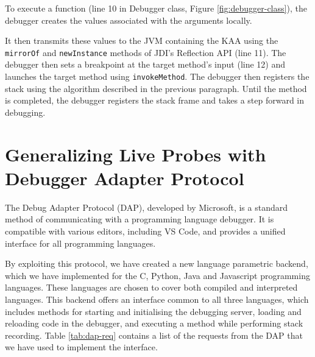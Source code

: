 \documentclass[english,submission]{programming}
\newcommand{\code}[1]{\colorbox{codegray}{\texttt{#1}}}
\begin{document}
To execute a function (line 10 in Debugger class, Figure \ref{fig:debugger-class}), the debugger creates the values associated with the arguments locally.

It then transmits these values to the JVM containing the KAA using the \code{mirrorOf} and \code{newInstance} methods of JDI's Reflection API (line 11).
The debugger then sets a breakpoint at the target method's input (line 12) and launches the target method using \code{invokeMethod}. 
The debugger then registers the stack using the algorithm described in the previous paragraph.
Until the method is completed, the debugger registers the stack frame and takes a step forward in debugging.

\section{Generalizing Live Probes with Debugger Adapter Protocol}
\label{sec:generalizing-live-probes}
The Debug Adapter Protocol (DAP), developed by Microsoft, is a standard method of communicating with a programming language debugger. It is compatible with various editors, including VS Code, and provides a unified interface for all programming languages. 

By exploiting this protocol, we have created a new language parametric backend, which we have implemented for the C, Python, Java and Javascript programming languages.
These languages are chosen to cover both compiled and interpreted languages. 
This backend offers an interface common to all three languages, which includes methods for starting and initialising the debugging server, loading and reloading code in the debugger, and executing a method while performing stack recording.
Table \ref{tab:dap-req} contains a list of the requests from the DAP that we have used to implement the interface.
\end{document}
